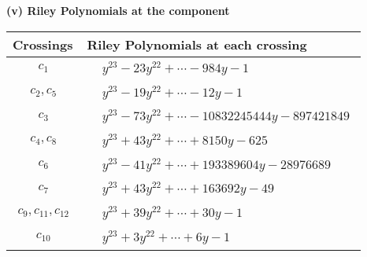 \documentclass[1p]{elsarticle_modified}
\theoremstyle{definition}
\begin{document}
\newpage\renewcommand{\arraystretch}{1}
\flushleft \textbf{(v) Riley Polynomials at the component}\newline \\
\begin{tabular}{m{50pt}|m{274pt}}
Crossings & \hspace{64pt}Riley Polynomials at each crossing \\
\hline $$\begin{aligned}c_{1}\end{aligned}$$&$\begin{aligned}
&y^{23}-23 y^{22}+\cdots-984 y-1
\end{aligned}$\\
\hline $$\begin{aligned}c_{2},c_{5}\end{aligned}$$&$\begin{aligned}
&y^{23}-19 y^{22}+\cdots-12 y-1
\end{aligned}$\\
\hline $$\begin{aligned}c_{3}\end{aligned}$$&$\begin{aligned}
&y^{23}-73 y^{22}+\cdots-10832245444 y-897421849
\end{aligned}$\\
\hline $$\begin{aligned}c_{4},c_{8}\end{aligned}$$&$\begin{aligned}
&y^{23}+43 y^{22}+\cdots+8150 y-625
\end{aligned}$\\
\hline $$\begin{aligned}c_{6}\end{aligned}$$&$\begin{aligned}
&y^{23}-41 y^{22}+\cdots+193389604 y-28976689
\end{aligned}$\\
\hline $$\begin{aligned}c_{7}\end{aligned}$$&$\begin{aligned}
&y^{23}+43 y^{22}+\cdots+163692 y-49
\end{aligned}$\\
\hline $$\begin{aligned}c_{9},c_{11},c_{12}\end{aligned}$$&$\begin{aligned}
&y^{23}+39 y^{22}+\cdots+30 y-1
\end{aligned}$\\
\hline $$\begin{aligned}c_{10}\end{aligned}$$&$\begin{aligned}
&y^{23}+3 y^{22}+\cdots+6 y-1
\end{aligned}$\\
\hline
\end{tabular}\\~\\
\end{document}

